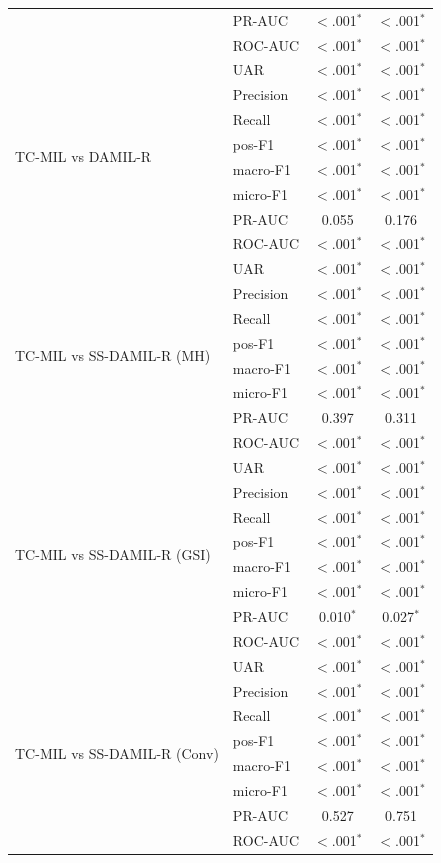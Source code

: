 \documentclass[conference]{IEEEtran}
\begin{document}
\begin{table}[t]
\begin{tabular}{@{}llcc@{}}
 & PR-AUC & $<$.001$^{*}$ & $<$.001$^{*}$ \\
 & ROC-AUC & $<$.001$^{*}$ & $<$.001$^{*}$ \\
\midrule
\multirow{8}{*}{TC-MIL vs DAMIL-R} & UAR & $<$.001$^{*}$ & $<$.001$^{*}$ \\
 & Precision & $<$.001$^{*}$ & $<$.001$^{*}$ \\
 & Recall & $<$.001$^{*}$ & $<$.001$^{*}$ \\
 & pos-F1 & $<$.001$^{*}$ & $<$.001$^{*}$ \\
 & macro-F1 & $<$.001$^{*}$ & $<$.001$^{*}$ \\
 & micro-F1 & $<$.001$^{*}$ & $<$.001$^{*}$ \\
 & PR-AUC & 0.055 & 0.176 \\
 & ROC-AUC & $<$.001$^{*}$ & $<$.001$^{*}$ \\
\midrule
\multirow{8}{*}{TC-MIL vs SS-DAMIL-R (MH)} & UAR & $<$.001$^{*}$ & $<$.001$^{*}$ \\
 & Precision & $<$.001$^{*}$ & $<$.001$^{*}$ \\
 & Recall & $<$.001$^{*}$ & $<$.001$^{*}$ \\
 & pos-F1 & $<$.001$^{*}$ & $<$.001$^{*}$ \\
 & macro-F1 & $<$.001$^{*}$ & $<$.001$^{*}$ \\
 & micro-F1 & $<$.001$^{*}$ & $<$.001$^{*}$ \\
 & PR-AUC & 0.397 & 0.311 \\
 & ROC-AUC & $<$.001$^{*}$ & $<$.001$^{*}$ \\
\midrule
\multirow{8}{*}{TC-MIL vs SS-DAMIL-R (GSI)} & UAR & $<$.001$^{*}$ & $<$.001$^{*}$ \\
 & Precision & $<$.001$^{*}$ & $<$.001$^{*}$ \\
 & Recall & $<$.001$^{*}$ & $<$.001$^{*}$ \\
 & pos-F1 & $<$.001$^{*}$ & $<$.001$^{*}$ \\
 & macro-F1 & $<$.001$^{*}$ & $<$.001$^{*}$ \\
 & micro-F1 & $<$.001$^{*}$ & $<$.001$^{*}$ \\
 & PR-AUC & 0.010$^{*}$ & 0.027$^{*}$ \\
 & ROC-AUC & $<$.001$^{*}$ & $<$.001$^{*}$ \\
\midrule
\multirow{8}{*}{TC-MIL vs SS-DAMIL-R (Conv)} & UAR & $<$.001$^{*}$ & $<$.001$^{*}$ \\
 & Precision & $<$.001$^{*}$ & $<$.001$^{*}$ \\
 & Recall & $<$.001$^{*}$ & $<$.001$^{*}$ \\
 & pos-F1 & $<$.001$^{*}$ & $<$.001$^{*}$ \\
 & macro-F1 & $<$.001$^{*}$ & $<$.001$^{*}$ \\
 & micro-F1 & $<$.001$^{*}$ & $<$.001$^{*}$ \\
 & PR-AUC & 0.527 & 0.751 \\
 & ROC-AUC & $<$.001$^{*}$ & $<$.001$^{*}$ \\
\bottomrule
\end{tabular}
\end{table}
\end{document}
